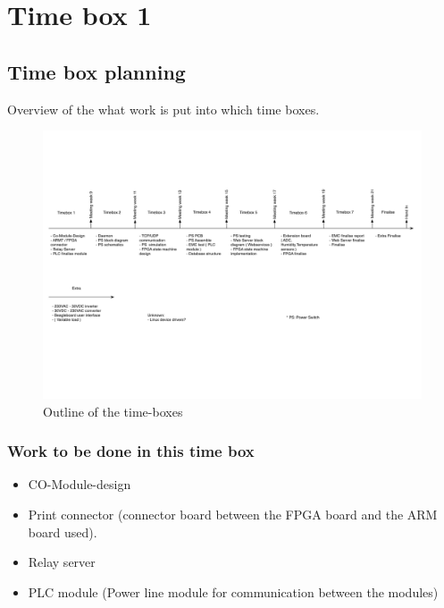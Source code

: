 \section{Time box 1}
\subsection{Time box planning}
Overview of the what work is put into which time boxes.
\begin{figure}[H]
	\begin{centering}
		 \includegraphics[width=1.0\textwidth]{images/tb_r1.pdf}
		\caption{Outline of the time-boxes}
	\end{centering}
\end{figure}

\subsubsection{Work to be done in this time box}
\begin{itemize}
	\item CO-Module-design
	\item Print connector (connector board between the FPGA board and the ARM board used).
	\item Relay server
	\item PLC module (Power line module for communication between the modules)
\end{itemize}

